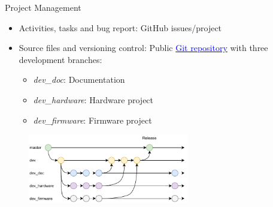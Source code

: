 %
%
%
%
%

%
%
%
%
%


\begin{frame}{Project Management}

    \begin{itemize}
        \item Activities, tasks and bug report: GitHub issues/project
        \vspace{0.25cm}
        \item Source files and versioning control: Public \href{https://github.com/spacelab-ufsc/obdh2}{\textcolor{blue}{Git repository}} with three development branches:
            \begin{itemize}
                \item \textit{dev\_doc}: Documentation
                \item \textit{dev\_hardware}: Hardware project
                \item \textit{dev\_firmware}: Firmware project
            \end{itemize}
    \end{itemize}

    \begin{figure}[!ht]
        \begin{center}
            \includegraphics[width=7cm]{figures/git-flow.pdf}
        \end{center}
    \end{figure}

\end{frame}